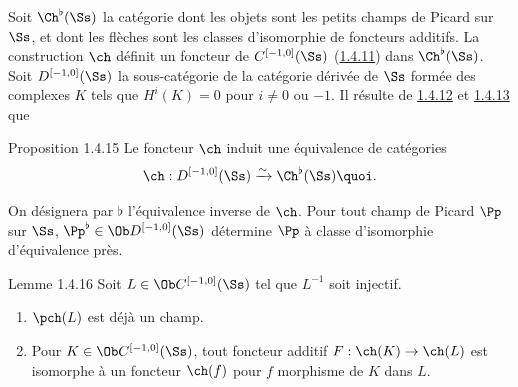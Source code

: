 \subsubsection{}
Soit $\Ch^{\flat}(\Ss)$ la catégorie dont les objets
sont les petits champs de Picard sur $\Ss$, et dont les
flèches sont les classes d'isomorphie de foncteurs\pageoriginale
additifs. La construction $\ch$ définit un foncteur de
$C^{[-1,0]}(\Ss)$ (\hyperref[XVIII.subsubsec1.4.11]{1.4.11}) dans
$\Ch^{\flat}(\Ss)$. Soit $D^{[-1,0]}(\Ss)$ la
sous-catégorie de la catégorie dérivée de $\Ss$ formée des
complexes $K$ tels que $H^{i}(K)=0$ pour $i\neq 0$ ou $-1$. Il résulte
de \hyperref[XVIII.subsubsec1.4.12]{1.4.12} et \hyperref[XVIII.lem1.4.13]{1.4.13} que

\begin{enonce*}{Proposition 1.4.15}
Le foncteur $\ch$ induit une équivalence de catégories
$$
\ch:D^{[-1,0]}(\Ss)\xrightarrow{\sim}
\Ch^{\flat}(\Ss){\quoi}.
$$
\end{enonce*}

On désignera par $\flat$ l'équivalence inverse de $\ch$. Pour tout
champ de Picard $\Pp$ sur $\Ss$,
$\Pp^{\flat}\in \Ob D^{[-1,0]}(\Ss)$ détermine
$\Pp$ à classe d'isomorphie d'équivalence près.

\begin{enonce*}{Lemme 1.4.16}
Soit $L\in \Ob C^{[-1,0]}(\Ss)$ tel que $L^{-1}$ soit
injectif.
\begin{enumerate}
\renewcommand{\theenumi}{\Roman{enumi}}
\renewcommand{\labelenumi}{(\theenumi)}
\item $\pch(L)$ est déjà un champ.

\item Pour $K\in \Ob C^{[-1,0]}(\Ss)$, tout foncteur additif
$F:\ch(K)\rightarrow \ch(L)$ est isomorphe à un foncteur $\ch(f)$ pour
$f$ morphisme de $K$ dans $L$.
\end{enumerate}
\end{enonce*}

